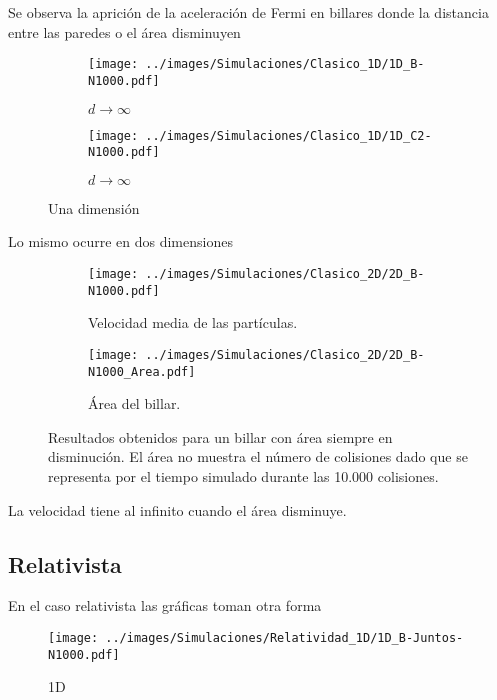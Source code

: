 \documentclass[11pt, spanish]{article}
\begin{document}
Se observa la aprición de la aceleración de Fermi en billares donde la distancia entre las paredes o el área disminuyen 

\begin{figure}[H]
    \centering
    \begin{subfigure}[b]{0.49\textwidth}
        \centering
        \texttt{[image: ../images/Simulaciones/Clasico\_1D/1D\_B-N1000.pdf]}
        \caption{\( d \rightarrow \infty \)}
        \label{fig:clasico_1D_A}
    \end{subfigure}
    \hfill
    \begin{subfigure}[b]{0.5\textwidth}
        \centering
        \texttt{[image: ../images/Simulaciones/Clasico\_1D/1D\_C2-N1000.pdf]}
        \caption{\( d \rightarrow \infty \)}
        \label{fig:clasico_1D_B}
    \end{subfigure}
    \caption{Una dimensión}
    \label{fig:clasico_1D}
\end{figure}

Lo mismo ocurre en dos dimensiones 

\begin{figure}[H]
    \begin{subfigure}[b]{0.5\textwidth}
        \centering
        \texttt{[image: ../images/Simulaciones/Clasico\_2D/2D\_B-N1000.pdf]}
        \caption{Velocidad media de las partículas.}
    \end{subfigure}
    \hfill
    \begin{subfigure}[b]{0.5\textwidth}
        \centering
        \texttt{[image: ../images/Simulaciones/Clasico\_2D/2D\_B-N1000\_Area.pdf]}
        \caption{Área del billar.}
    \end{subfigure}
    \caption{Resultados obtenidos para un billar con área siempre en disminución. El área no muestra el número de colisiones dado que se representa por el tiempo simulado durante las 10.000 colisiones.}
    \label{fig:2D_B-N1000_con_Area}
\end{figure}

La velocidad tiene al infinito cuando el área disminuye. 

\subsection{Relativista}

En el caso relativista las gráficas toman otra forma

\begin{figure}[H]
    \centering
        \texttt{[image: ../images/Simulaciones/Relatividad\_1D/1D\_B-Juntos-N1000.pdf]}
        \caption{$d \rightarrow 0$}
        \label{fig:relatividad_1D_B}
    \caption{1D}
\end{figure}
\end{document}
